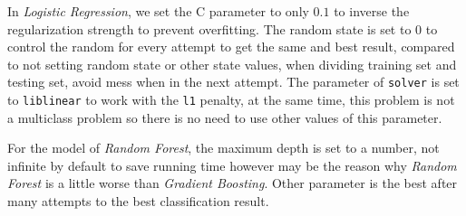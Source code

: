\documentclass{standalone}
\begin{document}
In \emph{Logistic Regression}, we set the C parameter to only $0.1$ to inverse
the regularization strength to prevent overfitting. The random state is set to
$0$ to control the random for every attempt to get the same and best result,
compared to not setting random state or other state values, when dividing
training set and testing set, avoid mess when in the next attempt. The
parameter of \verb|solver| is set to \verb|liblinear| to work with the
\verb|l1| penalty, at the same time, this problem is not a multiclass problem
so there is no need to use other values of this parameter.

For the model of \emph{Random Forest}, the maximum depth is set to a number,
not infinite by default to save running time however may be the reason why
\emph{Random Forest} is a little worse than \emph{Gradient Boosting}. Other
parameter is the best after many attempts to the best classification result.
\end{document}
